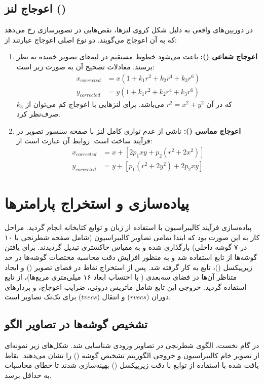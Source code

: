 \documentclass[12pt,a4paper]{article}
\begin{document}
\subsection{اعوجاج لنز ()}
در دوربین‌های واقعی به دلیل شکل کروی لنزها، نقص‌هایی در تصویرسازی رخ می‌دهد که به آن اعوجاج می‌گویند. دو نوع اصلی اعوجاج عبارتند از:
\begin{enumerate}
    \item \textbf{اعوجاج شعاعی ():} باعث می‌شود خطوط مستقیم در لبه‌های تصویر خمیده به نظر برسند. معادلات تصحیح آن به صورت زیر است:
    \begin{align}
    x_{corrected} &= x(1 + k_1 r^2 + k_2 r^4 + k_3 r^6) \\
    y_{corrected} &= y(1 + k_1 r^2 + k_2 r^4 + k_3 r^6)
    \end{align}
    که در آن $r^2=x^2+y^2$ می‌باشد. برای لنزهایی با اعوجاج کم می‌توان از $k_3$ صرف‌نظر کرد.
    
    \item \textbf{اعوجاج مماسی ():} ناشی از عدم توازی کامل لنز با صفحه سنسور تصویر در فرآیند ساخت است. روابط آن عبارت است از:
    \begin{align}
    x_{corrected} &= x + [2p_1xy + p_2(r^2 + 2x^2)] \\
    y_{corrected} &= y + [p_1(r^2 + 2y^2) + 2p_2xy]
    \end{align}
\end{enumerate}

\section{پیاده‌سازی و استخراج پارامترها}
پیاده‌سازی فرآیند کالیبراسیون با استفاده از زبان  و توابع کتابخانه  انجام گردید. مراحل کار به این صورت بود که ابتدا تمامی تصاویر کالیبراسیون (شامل صفحه شطرنجی با ۱۰ در ۷ گوشه داخلی) بارگذاری شده و به مقیاس خاکستری تبدیل گردیدند. 
برای یافتن گوشه‌ها از تابع  استفاده شد و به منظور افزایش دقت محاسبه مختصات گوشه‌ها در حد زیرپیکسل ()، تابع  به کار گرفته شد.
پس از استخراج نقاط در فضای تصویر () و ایجاد متناظر آن‌ها در فضای سه‌بعدی ( با احتساب ابعاد ۱۶ میلی‌متری مربع‌ها)، از تابع  استفاده گردید. خروجی این تابع شامل ماتریس درونی، ضرایب اعوجاج، و بردارهای دوران ($rvecs$) و انتقال ($tvecs$) برای تک‌تک تصاویر است.



\subsection{تشخیص گوشه‌ها در تصاویر الگو}
در گام نخست، الگوی شطرنجی در تصاویر ورودی شناسایی شد. شکل‌های زیر نمونه‌ای از تصویر خام کالیبراسیون و خروجی الگوریتم تشخیص گوشه () را نشان می‌دهند. نقاط یافت شده با استفاده از توابع  با دقت زیرپیکسل () بهینه‌سازی شدند تا خطای محاسبات به حداقل برسد.
\end{document}
